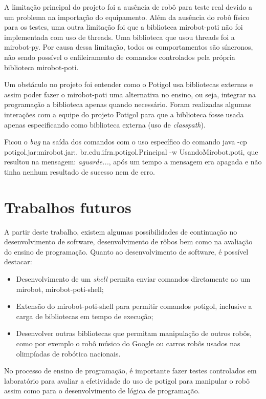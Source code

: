 A limitação principal do projeto foi a ausência de robô para teste real devido a um problema na importação do equipamento.
Além da ausência do robô físico para
os testes, uma outra limitação foi que a biblioteca mirobot-poti não foi implementada com uso de
threads. Uma biblioteca que usou threads foi a mirobot-py.
Por causa dessa limitação, todos os comportamentos são síncronos, não sendo possível o enfileiramento de comandos controlados pela própria biblioteca mirobot-poti.

Um obstáculo no projeto foi entender como o Potigol usa bibliotecas externas e assim poder fazer o mirobot-poti uma alternativa no ensino, ou seja, integrar na programação a biblioteca apenas quando necessário.
Foram realizadas algumas interações com a equipe do projeto Potigol para que a biblioteca fosse usada apenas especificando como biblioteca externa (uso de \textit{classpath}). 

Ficou o \textit{bug} na saída dos comandos com o uso específico do comando java -cp potigol.jar:mirobot.jar:. br.edu.ifrn.potigol.Principal -w UsandoMirobot.poti, que resultou na mensagem: \textit{aguarde...}, após um tempo a mensagem era apagada e não tinha nenhum resultado de sucesso nem de erro.



\section{Trabalhos futuros}

A partir deste trabalho, existem algumas possibilidades de continuação no desenvolvimento de software, desenvolvimento de rôbos bem como na avaliação do ensino de programação.
Quanto ao desenvolvimento de software, é possível destacar:

\begin{itemize}
    \item Desenvolvimento de um \textit{shell} permita enviar comandos diretamente ao um mirobot, mirobot-poti-shell;
    \item Extensão do mirobot-poti-shell para permitir comandos potigol, inclusive a carga de bibliotecas em tempo de execução;
    \item Desenvolver outras bibliotecas que permitam manipulação de outros robôs, como por exemplo o robô músico do Google ou carros robôs usados nas olimpíadas de robótica nacionais.
\end{itemize}


No processo de ensino de programação, é importante fazer testes controlados em laboratório para avaliar a efetividade do uso de potigol para manipular o robô assim como para o desenvolvimento de lógica de programação.
